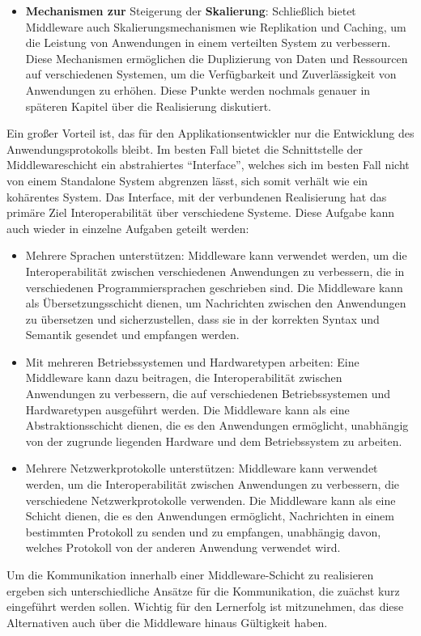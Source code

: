 \begin{itemize}
\item \textbf{Mechanismen zur} Steigerung der \textbf{Skalierung}: Schließlich bietet Middleware auch Skalierungsmechanismen wie Replikation und Caching, um die Leistung von Anwendungen in einem verteilten System zu verbessern. Diese Mechanismen ermöglichen die Duplizierung von Daten und Ressourcen auf verschiedenen Systemen, um die Verfügbarkeit und Zuverlässigkeit von Anwendungen zu erhöhen. Diese Punkte werden nochmals genauer in späteren Kapitel über die Realisierung diskutiert.
\end{itemize}
Ein großer Vorteil ist, das für den Applikationsentwickler nur die Entwicklung des Anwendungsprotokolls bleibt. Im besten Fall bietet die Schnittstelle der Middlewareschicht ein abstrahiertes \enquote{Interface}, welches sich im besten Fall nicht von einem Standalone System abgrenzen lässt, sich somit verhält wie ein kohärentes System. Das Interface, mit der verbundenen Realisierung hat das primäre Ziel Interoperabilität über verschiedene Systeme. Diese Aufgabe kann auch wieder in einzelne Aufgaben geteilt werden: 
\begin{itemize}
\item Mehrere Sprachen unterstützen: Middleware kann verwendet werden, um die Interoperabilität zwischen verschiedenen Anwendungen zu verbessern, die in verschiedenen Programmiersprachen geschrieben sind. Die Middleware kann als Übersetzungsschicht dienen, um Nachrichten zwischen den Anwendungen zu übersetzen und sicherzustellen, dass sie in der korrekten Syntax und Semantik gesendet und empfangen werden.
\item Mit mehreren Betriebssystemen und Hardwaretypen arbeiten: Eine Middleware kann dazu beitragen, die Interoperabilität zwischen Anwendungen zu verbessern, die auf verschiedenen Betriebssystemen und Hardwaretypen ausgeführt werden. Die Middleware kann als eine Abstraktionsschicht dienen, die es den Anwendungen ermöglicht, unabhängig von der zugrunde liegenden Hardware und dem Betriebssystem zu arbeiten.
\item Mehrere Netzwerkprotokolle unterstützen: Middleware kann verwendet werden, um die Interoperabilität zwischen Anwendungen zu verbessern, die verschiedene Netzwerkprotokolle verwenden. Die Middleware kann als eine Schicht dienen, die es den Anwendungen ermöglicht, Nachrichten in einem bestimmten Protokoll zu senden und zu empfangen, unabhängig davon, welches Protokoll von der anderen Anwendung verwendet wird.
\end{itemize}
Um die Kommunikation innerhalb einer Middleware-Schicht zu realisieren ergeben sich unterschiedliche Ansätze für die Kommunikation, die zuächst kurz eingeführt werden sollen. Wichtig für den Lernerfolg ist mitzunehmen, das diese Alternativen auch über die Middleware hinaus Gültigkeit haben.  
